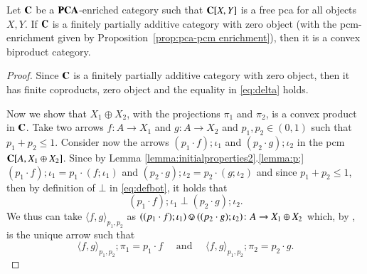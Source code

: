 \begin{proposition}\label{prop:fpac}
Let $\mathbf{C}$ be a  $\mathbf{PCA}$-enriched category such that $\mathbf{C}[X,Y]$ is a free pca for all objects $X,Y$. If $\mathbf{C}$  is a finitely partially additive category with zero object (with the pcm-enrichment given by Proposition~\ref{prop:pca-pcm enrichment}), then it is a convex biproduct category.
\end{proposition}
\begin{proof}
Since $\mathbf{C}$ is a finitely partially additive category with zero object, then  it has finite coproducts, zero object and the equality in \eqref{eq:delta} holds.

Now we show that $X_1\oplus X_2$, with the projections $\pi_1$ and $\pi_2$,%
 is a convex product in $\mathbf{C}$. Take two arrows $f\colon A\to X_1$ and $g\colon A \to X_2$ and $p_1,p_2\in (0,1)$ such that $p_1+p_2\leq 1$.
Consider now the arrows $(p_1\cdot f) ; \iota_1$ and $(p_2 \cdot g) ;\iota_2$ in the pcm  $\mathbf{C}[A , X_1\oplus X_2]$. Since by Lemma \ref{lemma:initialproperties2}.\ref{lemma:p;}  $(p_1\cdot f) ; \iota_1 = p_1 \cdot(f;\iota_1)$ and 
$(p_2\cdot g) ; \iota_2 = p_2 \cdot(g;\iota_2)$ and since $p_1+p_2\leq 1$, then by definition of $\bot$ in \eqref{eq:defbot}, it holds that 
\[(p_1\cdot f) ; \iota_1 \; \bot \; (p_2 \cdot g ) ;\iota_2 \text{.}\]
We thus can take $\langle f,g\rangle_{p_1,p_2}$ as $((p_1\cdot f) ; \iota_1)  \circledvee ((p_2 \cdot g ) ;\iota_2)\colon A \to X_1\oplus X_2$ which, by  \cite[Proposition 3.1.9]{chophd}, is the unique arrow such that \[\langle f,g\rangle_{p_1,p_2} ; \pi_1 = p_1\cdot f \quad \text{ and } \quad \langle f,g\rangle_{p_1,p_2} ; \pi_2 = p_2\cdot g\text{.}\]
\end{proof}

\iffalse
{}




